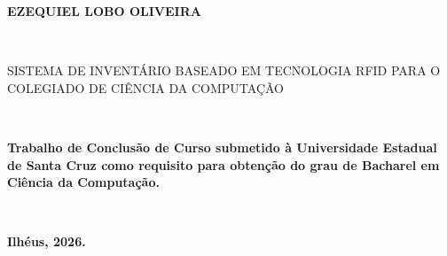 
%
% 
%
\begin{folhadeaprovacao}


\begin{center}

    {\large \begin{large} \bfseries EZEQUIEL LOBO OLIVEIRA\end{large}\\}
    \vspace{4cm}
    {\large\bfseries{\begin{large}SISTEMA DE INVENTÁRIO BASEADO EM TECNOLOGIA RFID PARA O COLEGIADO DE CIÊNCIA DA COMPUTAÇÃO \end{large}}\\}
    \vspace{1cm}
    \hspace{.45\linewidth}
    \begin{minipage}{.50\linewidth}

            \textbf{Trabalho de Conclusão de Curso submetido à Universidade Estadual de Santa Cruz  como requisito 
            para obtenção do grau de Bacharel em Ciência da Computação. }
    \end{minipage}
    \\
\end{center}
    \textbf{Ilhéus, 2026.}
\begin{center}
           

    \bfseries{}
\end{center}


    \vspace{2.5cm}
    \vspace{3 cm}%

  
\end{folhadeaprovacao}
